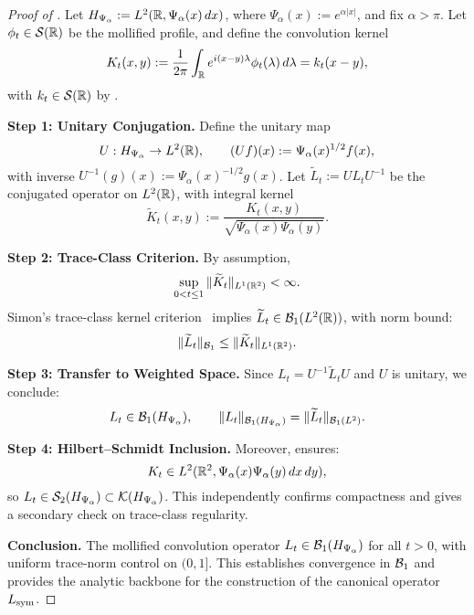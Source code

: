 \begin{proof}[Proof of ]
Let \( H_{\Psi_\alpha} := L^2(\mathbb{R}, \Psi_\alpha(x)\, dx) \), where \( \Psi_\alpha(x) := e^{\alpha |x|} \), and fix \( \alpha > \pi \). Let \( \phi_t \in \mathcal{S}(\mathbb{R}) \) be the mollified profile, and define the convolution kernel
\[
K_t(x, y) := \frac{1}{2\pi} \int_{\mathbb{R}} e^{i(x - y)\lambda} \phi_t(\lambda)\, d\lambda = k_t(x - y),
\]
with \( k_t \in \mathcal{S}(\mathbb{R}) \) by .

\smallskip
\noindent\textbf{Step 1: Unitary Conjugation.}  
Define the unitary map
\[
U : H_{\Psi_\alpha} \to L^2(\mathbb{R}), \qquad (Uf)(x) := \Psi_\alpha(x)^{1/2} f(x),
\]
with inverse \( U^{-1}(g)(x) := \Psi_\alpha(x)^{-1/2} g(x) \). Let \( \widetilde{L}_t := U L_t U^{-1} \) be the conjugated operator on \( L^2(\mathbb{R}) \), with integral kernel
\[
\widetilde{K}_t(x, y) := \frac{K_t(x, y)}{\sqrt{\Psi_\alpha(x) \Psi_\alpha(y)}}.
\]

\smallskip
\noindent\textbf{Step 2: Trace-Class Criterion.}  
By assumption,
\[
\sup_{0 < t \le 1} \| \widetilde{K}_t \|_{L^1(\mathbb{R}^2)} < \infty.
\]
Simon’s trace-class kernel criterion~\cite[Thm.~4.2]{Simon2005TraceIdeals} implies \( \widetilde{L}_t \in \mathcal{B}_1(L^2(\mathbb{R})) \), with norm bound:
\[
\| \widetilde{L}_t \|_{\mathcal{B}_1} \le \| \widetilde{K}_t \|_{L^1(\mathbb{R}^2)}.
\]

\smallskip
\noindent\textbf{Step 3: Transfer to Weighted Space.}  
Since \( L_t = U^{-1} \widetilde{L}_t U \) and \( U \) is unitary, we conclude:
\[
L_t \in \mathcal{B}_1(H_{\Psi_\alpha}), \qquad \| L_t \|_{\mathcal{B}_1(H_{\Psi_\alpha})} = \| \widetilde{L}_t \|_{\mathcal{B}_1(L^2)}.
\]

\smallskip
\noindent\textbf{Step 4: Hilbert–Schmidt Inclusion.}  
Moreover,  ensures:
\[
K_t \in L^2(\mathbb{R}^2, \Psi_\alpha(x) \Psi_\alpha(y)\, dx\, dy),
\]
so \( L_t \in \mathcal{S}_2(H_{\Psi_\alpha}) \subset \mathcal{K}(H_{\Psi_\alpha}) \). This independently confirms compactness and gives a secondary check on trace-class regularity.

\smallskip
\noindent\textbf{Conclusion.}  
The mollified convolution operator \( L_t \in \mathcal{B}_1(H_{\Psi_\alpha}) \) for all \( t > 0 \), with uniform trace-norm control on \( (0,1] \). This establishes convergence in \( \mathcal{B}_1 \) and provides the analytic backbone for the construction of the canonical operator \( L_{\mathrm{sym}} \).
\end{proof}
